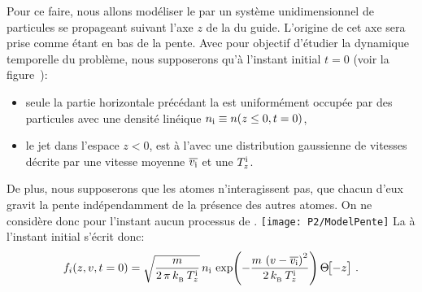 Pour ce faire, nous allons modéliser le \jat par un système unidimensionnel de particules se propageant suivant l'axe $z$ de la \secpent du guide. L'origine de cet axe sera prise comme étant en bas de la pente. Avec pour objectif d'étudier la dynamique temporelle du problème, nous supposerons qu'à l'instant initial $t=0$ (voir la figure~):
\begin{itemize}
	\item seule la partie horizontale précédant la \secpent est uniformément occupée par des particules avec une densité linéique $n_{\rm i} \equiv n(z \leq 0, t = 0)$,
 \item le jet dans l'espace $z<0$, est à l'\eqthdy avec une distribution gaussienne de vitesses décrite par une vitesse moyenne ${\overline{v_{\rm i}}}$ et une \templong $T_{z}^{\rm i}$. 
\end{itemize}
De plus, nous supposerons que les atomes n'interagissent pas, \cad que chacun d'eux gravit la pente indépendamment de la présence des autres atomes. On ne considère donc pour l'instant aucun processus de \reth.
\bfigs
\texttt{[image: P2/ModelPente]}
{}
\label{fig:ModelPente}
\efig
La \fdddedpup à l'instant initial s'écrit donc:
\begin{equation}\label{eq:fiPente}
	f_i(z, v, t=0) = \sqrt{\frac{m}{2\,\pi\,\kb\,\Tlongini}} \, \Nlongini
	\,\Expo{-\frac{m\,\left( v - \vjetini \right)^2}{2\,\kb\,\Tlongini}} \Heaviside{-z}
	\pointformule
\end{equation}

